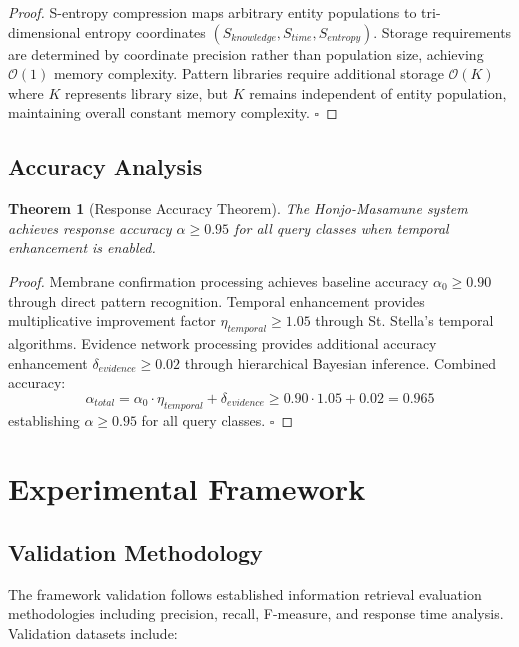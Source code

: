 \documentclass[12pt,a4paper]{article}
\newtheorem{theorem}{Theorem}
\begin{document}
\begin{proof}
S-entropy compression maps arbitrary entity populations to tri-dimensional entropy coordinates $(S_{knowledge}, S_{time}, S_{entropy})$. Storage requirements are determined by coordinate precision rather than population size, achieving $\mathcal{O}(1)$ memory complexity. Pattern libraries require additional storage $\mathcal{O}(K)$ where $K$ represents library size, but $K$ remains independent of entity population, maintaining overall constant memory complexity. $\square$
\end{proof}

\subsection{Accuracy Analysis}

\begin{theorem}[Response Accuracy Theorem]
The Honjo-Masamune system achieves response accuracy $\alpha \geq 0.95$ for all query classes when temporal enhancement is enabled.
\end{theorem}

\begin{proof}
Membrane confirmation processing achieves baseline accuracy $\alpha_0 \geq 0.90$ through direct pattern recognition. Temporal enhancement provides multiplicative improvement factor $\eta_{temporal} \geq 1.05$ through St. Stella's temporal algorithms. Evidence network processing provides additional accuracy enhancement $\delta_{evidence} \geq 0.02$ through hierarchical Bayesian inference. Combined accuracy:
\begin{equation}
\alpha_{total} = \alpha_0 \cdot \eta_{temporal} + \delta_{evidence} \geq 0.90 \cdot 1.05 + 0.02 = 0.965
\end{equation}
establishing $\alpha \geq 0.95$ for all query classes. $\square$
\end{proof}

\section{Experimental Framework}

\subsection{Validation Methodology}

The framework validation follows established information retrieval evaluation methodologies including precision, recall, F-measure, and response time analysis. Validation datasets include:
\end{document}
